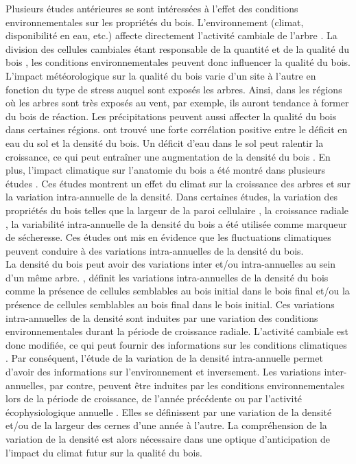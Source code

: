 \documentclass[a4paper,12pt]{report}
\begin{document}
Plusieurs études antérieures se sont intéressées à l'effet des conditions environnementales sur les propriétés du bois. L'environnement (climat, disponibilité en eau, etc.) affecte directement l'activité cambiale de l'arbre \citep{FRITTS1976,Kozlowski1997}. La division des cellules cambiales étant responsable de la quantité et de la qualité du bois \citep{Begum2013}, les conditions environnementales peuvent donc influencer la qualité du bois. L'impact météorologique sur la qualité du bois varie d'un site à l'autre en fonction du type de stress auquel sont exposés les arbres. Ainsi, dans les régions où les arbres sont très exposés au vent, par exemple, ils auront tendance à former du bois de réaction. Les précipitations peuvent aussi affecter la qualité du bois dans certaines régions. \cite{Bouriaud2005} ont trouvé une forte corrélation positive entre le déficit en eau du sol et la densité du bois. Un déficit d'eau dans le sol peut ralentir la croissance, ce qui peut entraîner une augmentation de la densité du bois \citep{GARDINER2011}. En plus, l'impact climatique sur l'anatomie du bois a été montré dans plusieurs études \citep{Bouriaud2005,Fritts2001,Campelo2013}. Ces études montrent un effet du climat sur la croissance des arbres et sur la variation intra-annuelle de la densité. Dans certaines études, la variation des propriétés du bois telles que la largeur de la paroi cellulaire \citep{Fritts2001}, la croissance radiale \citep{Jyske2009}, la variabilité intra-annuelle de la densité du bois \citep{Wimmer2000,Rigling2001,Wilkinson2015} a été utilisée comme marqueur de sécheresse. Ces études ont mis en évidence que les fluctuations climatiques peuvent conduire à des variations intra-annuelles de la densité du bois. \\

La densité du bois peut avoir des variations inter et/ou intra-annuelles au sein d'un même arbre. \cite{Fritts2001}, définit les variations intra-annuelles de la densité du bois comme la présence de cellules semblables au bois initial dans le bois final et/ou la présence de cellules semblables au bois final dans le bois initial. Ces variations intra-annuelles de la densité sont induites par une variation des conditions environnementales durant la période de croissance radiale. L'activité cambiale est donc modifiée, ce qui peut fournir des informations sur les conditions climatiques \citep{Campeloa2007,Campelo2013,Novak2013}. Par conséquent, l'étude de la variation de la densité intra-annuelle permet d'avoir des informations sur l'environnement et inversement. Les variations inter-annuelles, par contre, peuvent être induites par les conditions environnementales lors de la période de croissance, de l'année précédente ou par l'activité écophysiologique annuelle \citep{Hughes1984,DArrigo1992}. Elles se définissent par une variation de la densité et/ou de la largeur des cernes d'une année à l'autre. La compréhension de la variation de la densité est alors nécessaire dans une optique d'anticipation de l'impact du climat futur sur la qualité du bois.\\
\end{document}
